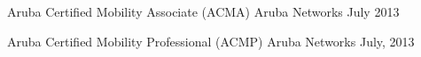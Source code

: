 

\begin{cvhonors}

  \cvhonor
    {Aruba Certified Mobility Associate (ACMA)} %
    {Aruba Networks} %
    {} %
    {July 2013} %

  \cvhonor
    {Aruba Certified Mobility Professional (ACMP)} %
    {Aruba Networks} %
    {} %
    {July, 2013} %

\end{cvhonors}
